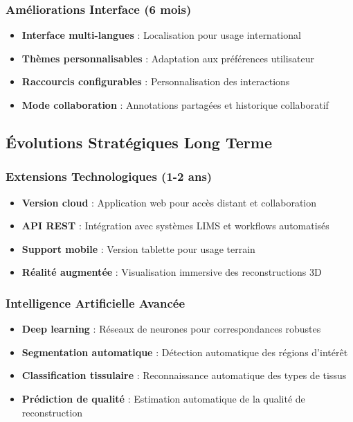 \documentclass[12pt,a4paper]{report}
\begin{document}
\subsubsection{Améliorations Interface (6 mois)}

\begin{itemize}
\item \textbf{Interface multi-langues} : Localisation pour usage international
\item \textbf{Thèmes personnalisables} : Adaptation aux préférences utilisateur
\item \textbf{Raccourcis configurables} : Personnalisation des interactions
\item \textbf{Mode collaboration} : Annotations partagées et historique collaboratif
\end{itemize}

\subsection{Évolutions Stratégiques Long Terme}

\subsubsection{Extensions Technologiques (1-2 ans)}

\begin{itemize}
\item \textbf{Version cloud} : Application web pour accès distant et collaboration
\item \textbf{API REST} : Intégration avec systèmes LIMS et workflows automatisés
\item \textbf{Support mobile} : Version tablette pour usage terrain
\item \textbf{Réalité augmentée} : Visualisation immersive des reconstructions 3D
\end{itemize}

\subsubsection{Intelligence Artificielle Avancée}

\begin{itemize}
\item \textbf{Deep learning} : Réseaux de neurones pour correspondances robustes
\item \textbf{Segmentation automatique} : Détection automatique des régions d'intérêt
\item \textbf{Classification tissulaire} : Reconnaissance automatique des types de tissus
\item \textbf{Prédiction de qualité} : Estimation automatique de la qualité de reconstruction
\end{itemize}
\end{document}
